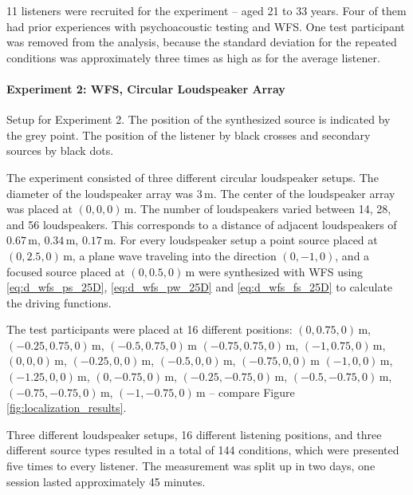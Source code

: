 11 listeners were recruited for the experiment -- aged 21 to 33 years.
Four of them had prior experiences with psychoacoustic testing and \ac{WFS}.
One test participant was removed from the analysis, because the standard
deviation for the repeated conditions was approximately three times as high as
for the average listener.


\paragraph{Experiment 2: \ac{WFS}, Circular Loudspeaker Array}
\label{sec:experiment2_wfs_circular_array}
%
\begin{marginfigure}
    \ft
    
    \caption{Setup for Experiment 2. The position of the synthesized
    source is indicated by the grey point. The position of the listener by black
    crosses and secondary sources by black dots.
        }
    \label{fig:setup_wfs_circular_array}
\end{marginfigure}
%
The experiment consisted of three different circular loudspeaker setups. The
diameter of the loudspeaker array was $3$\,m. The center of the
loudspeaker array was placed at $(0,0,0)$\,m. The number of loudspeakers
varied between 14, 28, and 56 loudspeakers. This corresponds to a distance
of adjacent loudspeakers of $0.67$\,m, $0.34$\,m, $0.17$\,m.
For every loudspeaker setup a point source placed at $(0,2.5,0)$\,m, a plane wave
traveling into the direction $(0,-1,0)$, and a focused source placed at $(0,0.5,0)$\,m
were synthesized with \ac{WFS} using \eqref{eq:d_wfs_ps_25D}, \eqref{eq:d_wfs_pw_25D}
and \eqref{eq:d_wfs_fs_25D} to calculate the driving functions.

The test participants were placed at 16 different positions: \linebreak
$(0,0.75,0)$\,m,
$(-0.25,0.75,0)$\,m, $(-0.5,0.75,0)$\,m $(-0.75,0.75,0)$\,m, \linebreak
$(-1,0.75,0)$\,m,
$(0,0,0)$\,m, $(-0.25,0,0)$\,m, $(-0.5,0,0)$\,m, $(-0.75,0,0)$\,m $(-1,0,0)$\,m,
$(-1.25,0,0)$\,m, $(0,-0.75,0)$\,m, $(-0.25,-0.75,0)$\,m, \linebreak
$(-0.5,-0.75,0)$\,m,
$(-0.75,-0.75,0)$\,m, $(-1,-0.75,0)$\,m -- compare
Figure\,\ref{fig:localization_results}.

Three different loudspeaker setups, 16 different listening positions, and
three different source types resulted in a total of 144 conditions, which were
presented five times to every listener. The measurement was split up in two
days, one session lasted approximately 45 minutes.

